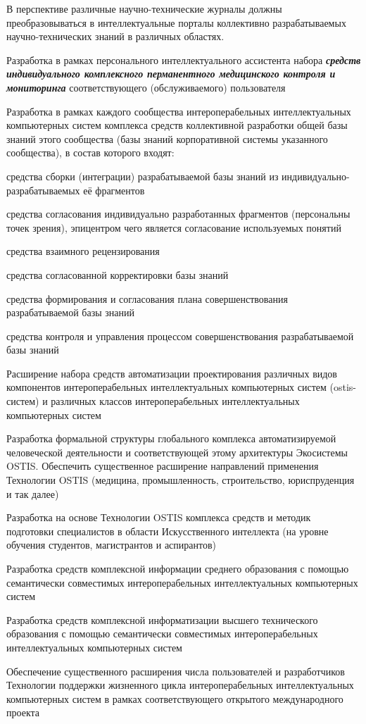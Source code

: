 \begin{textitemize}
\begin{textitemize}
		В перспективе различные научно-технические журналы должны преобразовываться в интеллектуальные порталы коллективно разрабатываемых научно-технических знаний в различных областях.
	\end{textitemize}
	\item
	Разработка в рамках персонального интеллектуального ассистента набора \textbf{\textit{средств индивидуального комплексного перманентного медицинского контроля и мониторинга}} соответствующего (обслуживаемого) пользователя
	\item Разработка в рамках каждого сообщества интероперабельных интеллектуальных компьютерных систем комплекса средств коллективной разработки общей базы знаний этого сообщества (базы знаний корпоративной системы указанного сообщества), в состав которого входят:
	\begin{textitemize}
		\item средства сборки (интеграции) разрабатываемой базы знаний из индивидуально-разрабатываемых её фрагментов
		\item средства согласования индивидуально разработанных фрагментов (персональны точек зрения), эпицентром чего является согласование используемых понятий
		\item средства взаимного рецензирования
		\item средства согласованной корректировки базы знаний
		\item средства формирования и согласования плана совершенствования разрабатываемой базы знаний
		\item средства контроля и управления процессом совершенствования разрабатываемой базы знаний
	\end{textitemize}
	\item Расширение набора средств автоматизации проектирования различных видов компонентов интероперабельных интеллектуальных компьютерных систем (ostis-систем) и различных классов интероперабельных интеллектуальных компьютерных систем
	\item Разработка формальной структуры глобального комплекса автоматизируемой человеческой деятельности и соответствующей этому архитектуры Экосистемы OSTIS. Обеспечить существенное расширение направлений применения Технологии OSTIS (медицина, промышленность, строительство, юриспруденция и так далее)
	\item Разработка на основе Технологии OSTIS комплекса средств и методик подготовки специалистов в области Искусственного интеллекта (на уровне обучения студентов, магистрантов и аспирантов)
	\item Разработка средств комплексной информации среднего образования с помощью семантически совместимых интероперабельных интеллектуальных компьютерных систем
	\item Разработка средств комплексной информатизации высшего технического образования с помощью семантически совместимых интероперабельных интеллектуальных компьютерных систем
	\item Обеспечение существенного расширения числа пользователей и разработчиков Технологии поддержки жизненного цикла интероперабельных интеллектуальных компьютерных систем в рамках соответствующего открытого международного проекта
\end{textitemize}